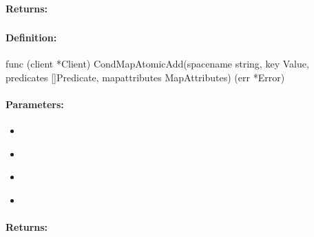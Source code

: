 \paragraph{Returns:}


\pagebreak
\subsubsection{}
\label{api:Go:CondMapAtomicAdd}


\paragraph{Definition:}
\begin{gocode}
func (client *Client) CondMapAtomicAdd(spacename string, key Value, predicates []Predicate, mapattributes MapAttributes) (err *Error)
\end{gocode}

\paragraph{Parameters:}
\begin{itemize}[noitemsep]
\item {}\\

\item {}\\

\item {}\\

\item {}\\

\end{itemize}

\paragraph{Returns:}


\pagebreak
\subsubsection{}
\label{api:Go:GroupMapAtomicAdd}


